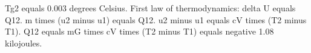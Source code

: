Tg2 equals 0.003 degrees Celsius.  
First law of thermodynamics: delta U equals Q12.  
m times (u2 minus u1) equals Q12.  
u2 minus u1 equals cV times (T2 minus T1).  
Q12 equals mG times cV times (T2 minus T1) equals negative 1.08 kilojoules.